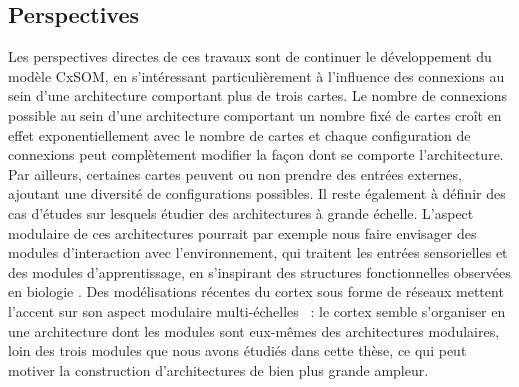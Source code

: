 \subsection*{Perspectives}

Les perspectives directes de ces travaux sont de continuer le développement du modèle CxSOM, en s'intéressant particulièrement à l'influence des connexions au sein d'une architecture comportant plus de trois cartes.
Le nombre de connexions possible au sein d'une architecture comportant un nombre fixé de cartes croît en effet exponentiellement avec le nombre de cartes et chaque configuration de connexions peut complètement modifier la façon dont se comporte l'architecture. 
Par ailleurs, certaines cartes peuvent ou non prendre des entrées externes, ajoutant une diversité de configurations possibles.
Il reste également à définir des cas d'études sur lesquels étudier des architectures à grande échelle.
L'aspect modulaire de ces architectures pourrait par exemple nous faire envisager des modules d'interaction avec l'environnement, qui traitent les entrées sensorielles et des modules d'apprentissage, en s'inspirant des structures fonctionnelles observées en biologie \parencite{Ellefsen2015NeuralMH}. 
Des modélisations récentes du cortex sous forme de réseaux mettent l'accent sur son aspect modulaire multi-échelles \parencite{betzel_multi-scale_2017}~: le cortex semble s'organiser en une architecture dont les modules sont eux-mêmes des architectures modulaires, loin des trois modules que nous avons étudiés dans cette thèse, ce qui peut motiver la construction d'architectures de bien plus grande ampleur.

